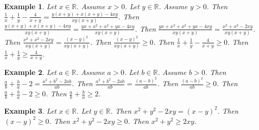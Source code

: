\documentclass[12pt]{article}
\newtheorem{example}{Example}
\begin{document}
\begin{example}
    Let $x\in\mathbb{R}$. Assume $x>0$.
    Let $y\in\mathbb{R}$. Assume $y>0$.
    Then $\frac{1}{x} + \frac{1}{y} - \frac{4}{x+y} = \frac{y(x+y) + x(x+y) - 4xy}{xy(x+y)}$.
    Then $\frac{y(x+y) + x(x+y) - 4xy}{xy(x+y)} = \frac{yx + x^2 + x^2 + yx - 4xy}{xy(x+y)}$.
    Then $\frac{yx + x^2 + x^2 + yx - 4xy}{xy(x+y)} = \frac{x^2 + x^2 -2xy}{xy(x+y)}$. %
    Then $\frac{x^2 + x^2 -2xy}{xy(x+y)} = \frac{{(x-y)}^2}{xy(x+y)}$.
    Then $\frac{{(x-y)}^2}{xy(x+y)} \ge 0$.
    Then $\frac{1}{x} + \frac{1}{y} - \frac{4}{x+y} \ge 0$.
    Then $\frac{1}{x} + \frac{1}{y} \ge \frac{4}{x+y}$.
\end{example}

\begin{example}
    Let $a\in\mathbb{R}$. Assume $a > 0$.
    Let $b\in\mathbb{R}$. Assume $b > 0$.
    Then $\frac{a}{b} + \frac{b}{a} - 2 = \frac{a^2 + b^2 - 2ab}{ab}$.
    Then $\frac{a^2 + b^2 - 2ab}{ab} = \frac{{(a-b)}^2}{ab}$.
    Then $\frac{{(a-b)}^2}{ab} \ge 0$.
    Then $\frac{a}{b} + \frac{b}{a} - 2 \ge 0$.
    Then $\frac{a}{b} + \frac{b}{a} \ge 2$.
\end{example}

\begin{example}
    Let $x\in\mathbb{R}$. Let $y\in\mathbb{R}$.
    Then $x^2 + y^2 - 2xy = {(x-y)}^2$.
    Then ${(x-y)}^2 \ge 0$.
    Then $x^2 + y^2 - 2xy \ge 0$.
    Then $x^2 + y^2 \ge 2xy$.
\end{example}
\end{document}
